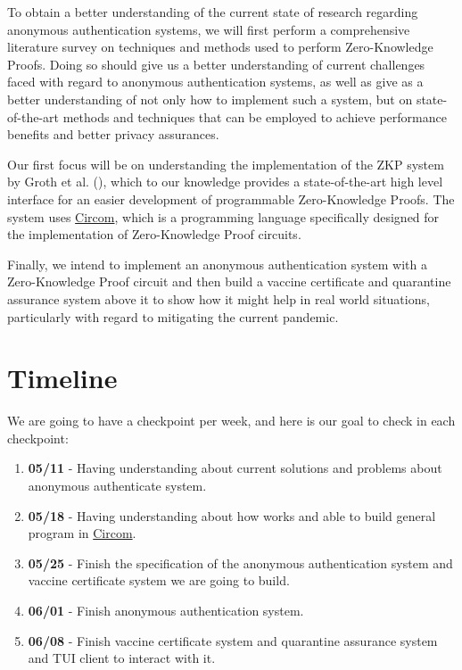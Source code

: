\documentclass[sigconf, nonacm=true]{acmart}
\begin{document}
To obtain a better understanding of the current state of research regarding anonymous
authentication systems, we will first perform a comprehensive literature survey on techniques and methods used to perform Zero-Knowledge Proofs. Doing so should give us a better understanding of current challenges faced with regard to anonymous authentication systems, as well as give as a better understanding of not only how to implement such a system, but on state-of-the-art methods and techniques that can be employed to achieve performance benefits and better privacy assurances.

Our first focus will be on understanding the implementation of the ZKP system by Groth et al. (\cite{Gro16}), which to our knowledge provides a state-of-the-art high level interface for an easier development of programmable Zero-Knowledge Proofs. The system uses \href{https://github.com/iden3/circom}{Circom}, which is a programming language specifically designed for the implementation of Zero-Knowledge Proof circuits.

Finally, we intend to implement an anonymous authentication system with a Zero-Knowledge Proof circuit
and then build a vaccine certificate and quarantine assurance system above it to show how it might help
in real world situations, particularly with regard to mitigating the current pandemic.

\section{Timeline}
We are going to have a checkpoint per week, and here is our goal to check in
each checkpoint:
\begin{enumerate}
	\item \textbf{05/11} - Having understanding about current solutions and
	      problems about anonymous authenticate system.
	\item \textbf{05/18} - Having understanding about how \cite{Gro16} works and
	      able to build general program in
	      \href{https://github.com/iden3/circom}{Circom}.
	\item \textbf{05/25} - Finish the specification of the anonymous
	      authentication system and vaccine certificate system we are going to build.
	\item \textbf{06/01} - Finish anonymous authentication system.
	\item \textbf{06/08} - Finish vaccine certificate system and quarantine assurance system and TUI client to interact with it.
\end{enumerate}
\end{document}
